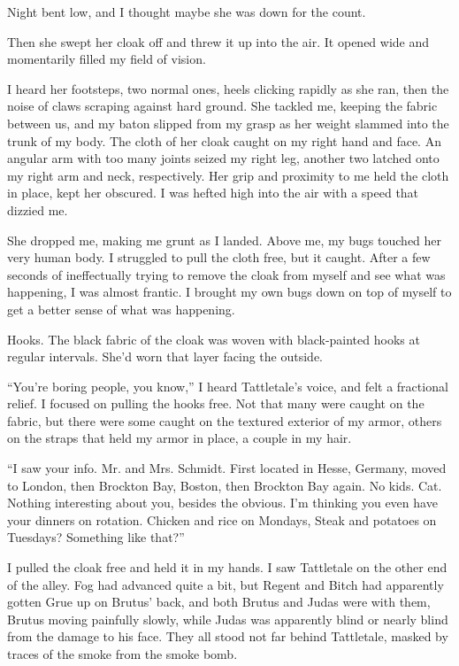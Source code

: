 Night bent low, and I thought maybe she was down for the count.



Then she swept her cloak off and threw it up into the air.  It opened wide and momentarily filled my field of vision.



I heard her footsteps, two normal ones, heels clicking rapidly as she ran, then the noise of claws scraping against hard ground.  She tackled me, keeping the fabric between us, and my baton slipped from my grasp as her weight slammed into the trunk of my body.  The cloth of her cloak caught on my right hand and face.  An angular arm with too many joints seized my right leg, another two latched onto my right arm and neck, respectively.  Her grip and proximity to me held the cloth in place, kept her obscured.  I was hefted high into the air with a speed that dizzied me.



She dropped me, making me grunt as I landed.  Above me, my bugs touched her very human body.  I struggled to pull the cloth free, but it caught.  After a few seconds of ineffectually trying to remove the cloak from myself and see what was happening, I was almost frantic.  I brought my own bugs down on top of myself to get a better sense of what was happening.



Hooks.  The black fabric of the cloak was woven with black-painted hooks at regular intervals.  She'd worn that layer facing the outside.



``You're boring people, you know,'' I heard Tattletale's voice, and felt a fractional relief.  I focused on pulling the hooks free.  Not that many were caught on the fabric, but there were some caught on the textured exterior of my armor, others on the straps that held my armor in place, a couple in my hair.



``I saw your info.  Mr. and Mrs. Schmidt.  First located in Hesse, Germany, moved to London, then Brockton Bay, Boston, then Brockton Bay again.  No kids.  Cat.   Nothing interesting about you, besides the obvious.  I'm thinking you even have your dinners on rotation.  Chicken and rice on Mondays, Steak and potatoes on Tuesdays?  Something like that?''



I pulled the cloak free and held it in my hands.  I saw Tattletale on the other end of the alley.  Fog had advanced quite a bit, but Regent and Bitch had apparently gotten Grue up on Brutus' back, and both Brutus and Judas were with them, Brutus moving painfully slowly, while Judas was apparently blind or nearly blind from the damage to his face.  They all stood not far behind Tattletale, masked by traces of the smoke from the smoke bomb.




